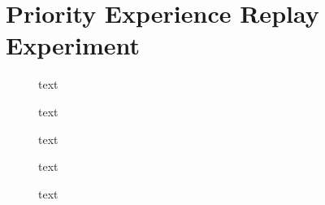 \section{Priority Experience Replay Experiment}

\begin{figure}[h]
	\centering
	
	\caption{text}
\end{figure}

\begin{figure}[h]
	\centering
	
	
	\caption{text}
	
	\vspace*{2cm}
	
	
	\caption{text}
\end{figure}

\begin{figure}[h]
	\centering

	
	\caption{text}
	
	\vspace*{2cm}
	
	
	\caption{text}
\end{figure}
